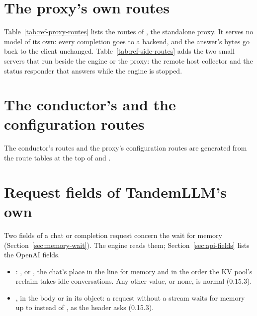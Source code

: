 

\section{The proxy's own routes}

Table~\ref{tab:ref-proxy-routes} lists the routes of , the standalone proxy. It serves no model of its own: every completion goes to a backend, and the answer's bytes go back to the client unchanged. Table~\ref{tab:ref-side-routes} adds the two small servers that run beside the engine or the proxy: the remote host collector and the status responder that answers while the engine is stopped.



\section{The conductor's and the configuration routes}

The conductor's routes and the proxy's configuration routes are generated from the route tables at the top of  and .



\section{Request fields of TandemLLM's own}\label{sec:ref-tandem-fields}

Two fields of a chat or completion request concern the wait for memory (Section~\ref{sec:memory-wait}). The engine reads them; Section~\ref{sec:api-fields} lists the OpenAI fields.

\begin{itemize}
\item {}: ,  or , the chat's place in the line for memory and in the order the KV pool's reclaim takes idle conversations. Any other value, or none, is normal (0.15.3).
\item {}, in the body or in its  object: a request without a stream waits for memory up to  instead of , as the header  asks (0.15.3).
\end{itemize}

